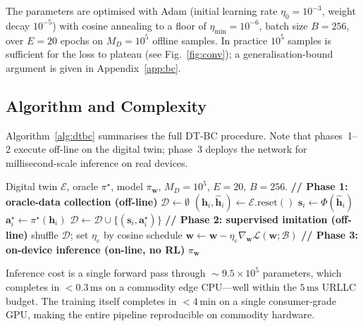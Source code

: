 \documentclass[journal]{IEEEtran}
\newcommand{\vect}[1]{\bm{#1}}
\newcommand{\Loss}{\mathcal{L}}
\begin{document}
The parameters are optimised with Adam (initial learning rate
$\eta_0\!=\!10^{-3}$, weight decay $10^{-5}$) with cosine annealing
to a floor of $\eta_{\min}\!=\!10^{-6}$, batch size $B\!=\!256$,
over $E\!=\!20$ epochs on $M_D\!=\!10^{5}$ offline samples.
In practice $10^{5}$ samples is sufficient for the loss to plateau
(see Fig.~\ref{fig:conv}); a generalisation-bound argument is
given in Appendix~\ref{app:bc}.

\subsection{Algorithm and Complexity}

Algorithm~\ref{alg:dtbc} summarises the full DT-BC procedure. Note
that phases~1--2 execute off-line on the digital twin; phase~3
deploys the network for millisecond-scale inference on real devices.

\begin{algorithm}[t]
\caption{DT-BC for Active STAR-RIS URLLC}
\label{alg:dtbc}
\begin{algorithmic}[1]
\Require Digital twin $\mathcal{E}$, oracle $\pi^{\star}$, model
$\pi_{\vect{w}}$, $M_D=10^5$, $E=20$, $B=256$.
\State \textbf{// Phase 1: oracle-data collection (off-line)}
\State $\mathcal{D}\leftarrow\emptyset$
  \State $(\vect{h}_i,\hat{\vect{h}}_i)\leftarrow\mathcal{E}.\text{reset}()$
  \State $\vect{s}_i\leftarrow\Phi(\hat{\vect{h}}_i)$
  \State $\vect{a}_i^{\star}\leftarrow\pi^{\star}(\vect{h}_i)$
  \State $\mathcal{D}\leftarrow\mathcal{D}\cup\{(\vect{s}_i,\vect{a}_i^{\star})\}$
\EndFor
\State \textbf{// Phase 2: supervised imitation (off-line)}
  \State shuffle $\mathcal{D}$; set $\eta_e$ by cosine schedule
    \State $\vect{w}\!\leftarrow\!\vect{w}\!-\!\eta_e\nabla_{\!\vect{w}}\Loss(\vect{w};\mathcal{B})$
  \EndFor
\EndFor
\State \textbf{// Phase 3: on-device inference (on-line, no RL)}
\State \Return $\pi_{\vect{w}}$
\end{algorithmic}
\end{algorithm}

Inference cost is a single forward pass through $\!\sim\!9.5\!\times\!10^5$
parameters, which completes in $<\!0.3\,\text{ms}$ on a commodity
edge CPU---well within the $5\,\text{ms}$ URLLC budget. The training
itself completes in $\!<\!4\,\text{min}$ on a single consumer-grade
GPU, making the entire pipeline reproducible on commodity hardware.
\end{document}
